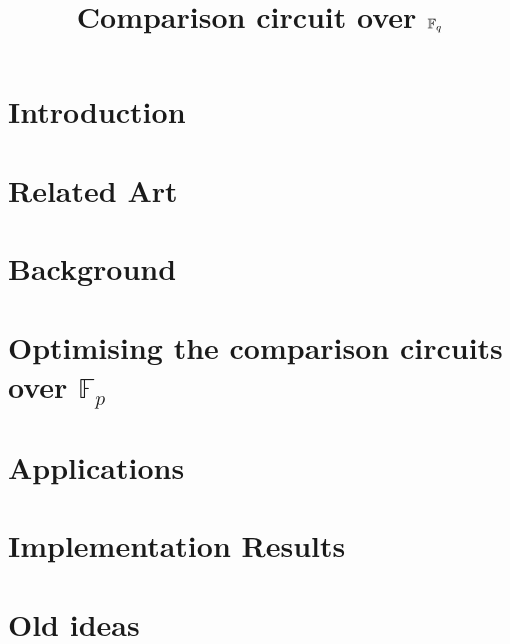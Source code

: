 \documentclass{llncs}
\title{Comparison circuit over $\mathbb{F}_q$}
\date{}
\author{}
\begin{document}
\maketitle

\section{Introduction}
\label{sec:introduction}




\section{Related Art}
\label{sec:related-art}



\section{Background}
\label{sec:background}


% 

\section{Optimising the comparison circuits over $\mathbb{F}_p$}
\label{sec:comparison-circuit}



\section{Applications}
\label{sec:applications}


\section{Implementation Results}
\label{sec:impl-results}


\section{Old ideas}




\end{document}
